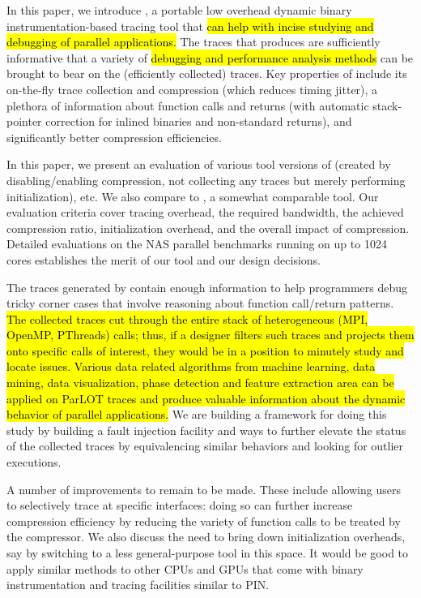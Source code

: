 
In this paper, we introduce \parlot, a portable low overhead dynamic
binary instrumentation-based
tracing tool that \hl{can help with incise studying and debugging of parallel applications.}
%
The traces that \parlot produces are sufficiently informative that
a variety of \hl{debugging and performance analysis methods} can be brought to bear on the
(efficiently collected) traces.
%
Key properties of \parlot include its on-the-fly trace collection and
compression (which reduces timing jitter), a plethora of information
about function calls and returns (with automatic stack-pointer 
correction for inlined binaries and non-standard returns), and
significantly better compression efficiencies.
%

In this paper, we present an evaluation of various tool versions of \parlot
(created by disabling/enabling compression, not collecting any traces but
merely performing initialization), etc.
%
We also compare \parlot to \callgrind, a somewhat comparable tool.
%
Our evaluation criteria cover tracing overhead, the required bandwidth,
the achieved compression ratio, initialization overhead, and the 
overall impact of compression.
%
Detailed evaluations on the NAS parallel benchmarks running on
up to 1024 cores establishes the merit of our tool and our design
decisions.

The traces generated by
\parlot  contain enough information to help programmers debug
tricky corner cases that involve reasoning about function call/return
patterns.
%
\hl{
The collected traces cut through the entire stack of heterogeneous
(MPI, OpenMP, PThreads) calls; thus, if a designer filters such traces
and projects them onto specific calls of interest, they would be in 
a position to minutely study and locate issues. Various data related algorithms from machine learning, data mining, data visualization, phase detection and feature extraction area can be applied on ParLOT traces and produce valuable information about the dynamic behavior of parallel applications.
}
We are  building a framework for doing this study by building
a fault injection facility and ways to further elevate the
status of the collected traces by equivalencing similar behaviors
and looking for outlier executions.


A number of improvements to \parlot remain to be made.
%
These include allowing users to selectively trace at specific
interfaces: doing so can further increase compression efficiency
by reducing the variety of function calls to be treated by
the compressor.
%
We also discuss the need to bring down initialization overheads, say
by switching to a less general-purpose tool in this space.
%
It would be good to apply similar methods to
other CPUs and GPUs that come with binary instrumentation and tracing
facilities similar to PIN.

